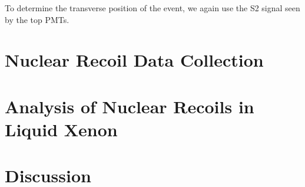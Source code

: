 To determine the transverse position of the event, we again use the S2 signal seen by the top PMTs.  




\section{Nuclear Recoil Data Collection}


\section{Analysis of Nuclear Recoils in Liquid Xenon}


\section{Discussion}



